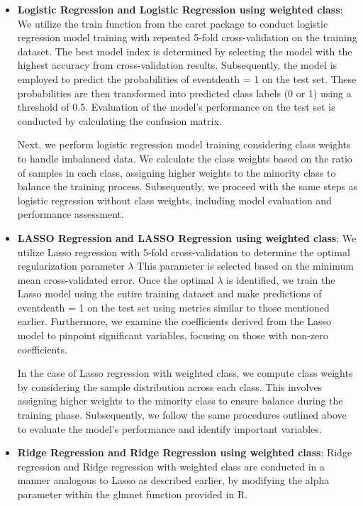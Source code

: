 \documentclass[11pt,singlespace]{article}
\begin{document}
	\begin{itemize}
		\item \textbf{Logistic Regression and Logistic Regression using weighted class}: We utilize the train function from the caret package to conduct logistic regression model training with repeated 5-fold cross-validation on the training dataset. The best model index is determined by selecting the model with the highest accuracy from cross-validation results. Subsequently, the model is employed to predict the probabilities of eventdeath = 1 on the test set. These probabilities are then transformed into predicted class labels (0 or 1) using a threshold of 0.5. Evaluation of the model's performance on the test set is conducted by calculating the confusion matrix.
		
		 Next, we perform logistic regression model training considering class weights to handle imbalanced data. We calculate the class weights based on the ratio of samples in each class, assigning higher weights to the minority class to balance the training process. Subsequently, we proceed with the same steps as logistic regression without class weights, including model evaluation and performance assessment.
		
		\item \textbf{LASSO Regression and LASSO Regression using weighted class}: We utilize Lasso regression with 5-fold cross-validation to determine the optimal regularization parameter $\lambda$ This parameter is selected based on the minimum mean cross-validated error. Once the optimal $\lambda$
		is identified, we train the Lasso model using the entire training dataset and make predictions of eventdeath = 1 on the test set using metrics similar to those mentioned earlier. Furthermore, we examine the coefficients derived from the Lasso model to pinpoint significant variables, focusing on those with non-zero coefficients.
		
		In the case of Lasso regression with weighted class, we compute class weights by considering the sample distribution across each class. This involves assigning higher weights to the minority class to ensure balance during the training phase. Subsequently, we follow the same procedures outlined above to evaluate the model's performance and identify important variables.
		
		\item \textbf{Ridge Regression and Ridge Regression using weighted class}: Ridge regression and Ridge regression with weighted class are conducted in a manner analogous to Lasso as described earlier, by modifying the alpha parameter within the glmnet function provided in R.
		

\end{itemize}
\end{document}
